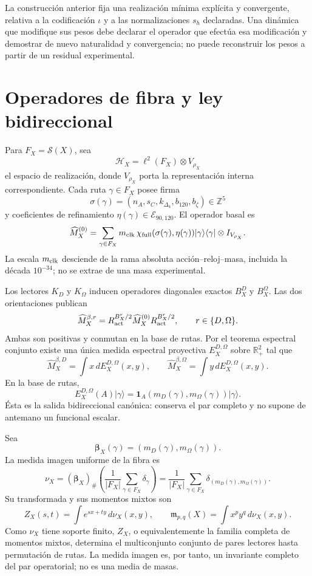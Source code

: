 La construcción anterior fija una realización mínima explícita y convergente,
relativa a la codificación \(\iota\) y a las normalizaciones \(s_h\) declaradas.
Una dinámica que modifique sus pesos debe declarar el operador que efectúa esa
modificación y demostrar de nuevo naturalidad y convergencia; no puede
reconstruir los pesos a partir de un residual experimental.

\section{Operadores de fibra y ley bidireccional}

Para \(F_X=\mathscr S(X)\), sea
\[
 \mathcal H_X=\ell^2(F_X)\otimes V_{\rho_X}
\]
el espacio de realización, donde \(V_{\rho_X}\) porta la representación
interna correspondiente. Cada ruta \(\gamma\in F_X\) posee firma
\[
 \sigma(\gamma)
 =(n_A,s_C,k_{\Delta_4},b_{120},b_\zeta)\in\mathbb Z^5
\]
y coeficientes de refinamiento
\(\eta(\gamma)\in\mathcal E_{90,120}\). El operador basal es
\[
 \widehat M_X^{(0)}
 =\sum_{\gamma\in F_X}
 m_{\rm clk}\,
 \chi_{\rm full}(\sigma(\gamma),\eta(\gamma))
 |\gamma\rangle\langle\gamma|\otimes I_{V_{\rho_X}}.
\]
La escala \(m_{\rm clk}\) desciende de la rama absoluta
acción--reloj--masa, incluida la década \(10^{-34}\); no se extrae de una
masa experimental.

Los lectores \(K_D\) y \(K_\Omega\) inducen operadores diagonales exactos
\(B_X^D\) y \(B_X^\Omega\). Las dos orientaciones publican
\[
 \widehat M_X^{\beta,r}
 =R_{\rm act}^{B_X^r/2}\widehat M_X^{(0)}
  R_{\rm act}^{B_X^r/2},
 \qquad r\in\{D,\Omega\}.
\]
Ambas son positivas y conmutan en la base de rutas. Por el teorema espectral
conjunto existe una única medida espectral proyectiva
\(E_X^{D,\Omega}\) sobre \(\mathbb R_+^2\) tal que
\[
 \widehat M_X^{\beta,D}
 =\int x\,dE_X^{D,\Omega}(x,y),
 \qquad
 \widehat M_X^{\beta,\Omega}
 =\int y\,dE_X^{D,\Omega}(x,y).
\]
En la base de rutas,
\[
 E_X^{D,\Omega}(A)|\gamma\rangle
 =\mathbf 1_A\!\left(m_D(\gamma),m_\Omega(\gamma)\right)
  |\gamma\rangle.
\]
Ésta es la salida bidireccional canónica: conserva el par completo y no
supone de antemano un funcional escalar.

Sea
\[
 \boldsymbol\beta_X(\gamma)
 =(m_D(\gamma),m_\Omega(\gamma)).
\]
La medida imagen uniforme de la fibra es
\[
 \nu_X=(\boldsymbol\beta_X)_\#
 \left(\frac1{|F_X|}\sum_{\gamma\in F_X}\delta_\gamma\right)
 =\frac1{|F_X|}\sum_{\gamma\in F_X}
 \delta_{(m_D(\gamma),m_\Omega(\gamma))}.
\]
Su transformada y sus momentos mixtos son
\[
 Z_X(s,t)=\int e^{sx+ty}\,d\nu_X(x,y),
 \qquad
 \mathfrak m_{p,q}(X)=\int x^py^q\,d\nu_X(x,y).
\]
Como \(\nu_X\) tiene soporte finito, \(Z_X\), o equivalentemente la familia
completa de momentos mixtos, determina el multiconjunto conjunto de pares
lectores hasta permutación de rutas. La medida imagen es, por tanto, un
invariante completo del par operatorial; no es una media de masas.

